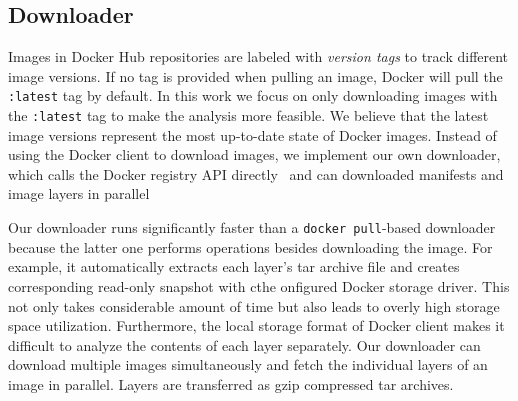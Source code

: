 \subsection{Downloader}
\label{sec:downloader}

Images in Docker Hub repositories are labeled with \emph{version tags}
to track different image versions.
%
%
If no tag is provided when pulling an image, 
Docker will pull the \texttt{:latest} tag by default.
%
In this work we focus on only downloading images with the \texttt{:latest} tag to
make the analysis more feasible. We believe that the latest
image versions represent the most up-to-date state of Docker images.
%
Instead of using the Docker client to download images,
we implement our own downloader, which calls the Docker registry API
directly~\cite{dockerregistryclient} and can downloaded manifests
and image layers in parallel

Our downloader runs significantly faster than a \texttt{docker pull}-based downloader
because the latter one performs operations besides downloading the image.
For example, it automatically extracts each layer's tar archive file
and creates corresponding read-only snapshot with cthe onfigured Docker storage driver.
This not only takes considerable amount of time but also leads
to overly high storage space utilization.
%
Furthermore, the local storage format of Docker client makes it difficult
to analyze the contents of each layer separately.
%
Our downloader can download multiple images simultaneously and fetch
the individual layers of an image in parallel. Layers are transferred as gzip
compressed tar archives.

%
%


